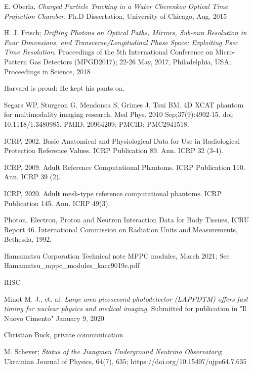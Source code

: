 \documentclass[12pt]{article}
\begin{document}
\begin{thebibliography}{99}
 E. Oberla, {\it Charged Particle Tracking in a
  Water Cherenkov Optical Time Projection Chamber}, Ph.D Dissertation,
  University of Chicago, Aug. 2015

 H. J. Frisch; {\it Drifting Photons on Optical Paths, Mirrors, Sub-mm
  Resolution in Four Dimensions, and Transverse/Longitudinal Phase Space:
  Exploiting Psec Time Resolution}. Proceedings of the
  5th International Conference on Micro-Pattern Gas Detectors
  (MPGD2017); 22-26 May, 2017, Philadelphia, USA; Proceedings in Science, 2018

 Harvard is proud: He kept his pants on.

 Segars WP, Sturgeon G, Mendonca S, Grimes J, Tsui BM. 4D XCAT phantom for multimodality imaging research. Med Phys. 2010 Sep;37(9):4902-15. doi: 10.1118/1.3480985. PMID: 20964209; PMCID: PMC2941518.

 ICRP, 2002. Basic Anatomical and Physiological Data for Use in Radiological Protection Reference Values. ICRP Publication 89. Ann. ICRP 32 (3-4).

 ICRP, 2009. Adult Reference Computational Phantoms. ICRP Publication 110. Ann. ICRP 39 (2).

 ICRP, 2020. Adult mesh-type reference computational phantoms. ICRP Publication 145. Ann. ICRP 49(3).

 Photon, Electron, Proton and Neutron Interaction Data for Body Tissues, ICRU Report 46. International Commission on Radiation Units and Measurements, Bethesda, 1992.

 Hamamatsu Corporation Technical note MPPC modules, March 2021; See Hamamatsu\_mppc\_modules\_kacc9019e.pdf

 RISC

 Minot M. J., et. al. {\it Large area
  picosecond photodetector (LAPPDTM) offers fast timing for nuclear
  physics and medical imaging}, Submitted for publication in "Il Nuovo
  Cimento" January 9, 2020

 Christian Buck, private communication

 M. Schever; {\it Status of the Jiangmen Underground Neutrino
Observatory};\\
 Ukrainian Journal of Physics, 64(7), 635; https://doi.org/10.15407/ujpe64.7.635


\end{thebibliography}
\end{document}
